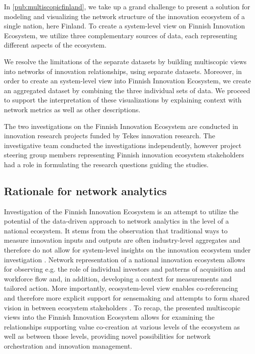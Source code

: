 In \ref{pub:multiscopicfinland}, we \citep{Still2013NetworksFinland} take up a grand challenge to present a solution for modeling and visualizing the network structure of the innovation ecosystem of a single nation, here Finland. To create a system-level view on Finnish Innovation Ecosystem, we utilize three complementary sources of data, each representing different aspects of the ecosystem.

We resolve the limitations of the separate datasets by building multiscopic views into networks of innovation relationships, using separate datasets. Moreover, in order to create an system-level view into Finnish Innovation Ecosystem, we create an aggregated dataset by combining the three individual sets of data. We proceed to support the interpretation of these visualizations by explaining context with network metrics as well as other descriptions.

The two investigations on the Finnish Innovation Ecosystem are conducted in innovation research projects funded by Tekes innovation research. The investigative team conducted the investigations independently, however project steering group members representing Finnish innovation ecosystem stakeholders had a role in formulating the research questions guiding the studies.  

\subsection{Rationale for network analytics}

Investigation of the Finnish Innovation Ecosystem is an attempt to utilize the potential of the data-driven approach to network analytics in the level of a national ecosystem. It stems from the observation  that traditional ways to measure innovation inputs and outputs are often industry-level aggregates and therefore do not allow for system-level insights on the innovation ecosystem under investigation \citep{Still2012ParadigmDigital}. Network representation of a national innovation ecosystem allows for observing e.g. the role of individual investors and patterns of acquisition and workforce flow and, in addition, developing a context for measurements and tailored action. More importantly, ecosystem-level view enables co-referencing and therefore more explicit support for sensemaking and attempts to form shared vision in between ecosystem stakeholders \citep{Russell2011TransformingOrchestration}. To recap, the presented multiscopic views into the Finnish Innovation Ecosystem allows for examining the relationships supporting value co-creation at various levels of the ecosystem as well as between those levels, providing novel possibilities for network orchestration and innovation management.

